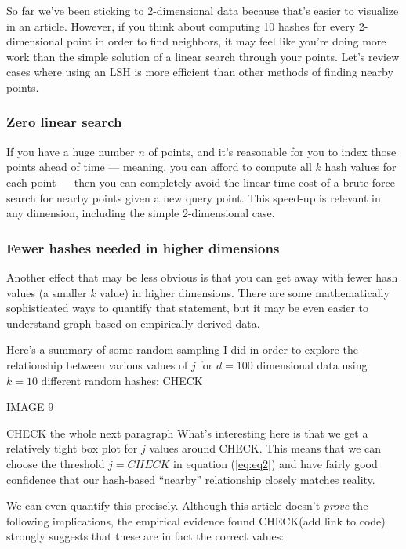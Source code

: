 \documentclass[20pt,]{extarticle}
\begin{document}
So far we've been sticking to 2-dimensional data because that's easier
to visualize in an article. However, if you think about computing 10
hashes for every 2-dimensional point in order to find neighbors, it may
feel like you're doing more work than the simple solution of a linear
search through your points. Let's review cases where using an LSH is
more efficient than other methods of finding nearby points.

\subsubsection{Zero linear search}\label{zero-linear-search}

If you have a huge number \(n\) of points, and it's reasonable for you
to index those points ahead of time --- meaning, you can afford to
compute all \(k\) hash values for each point --- then you can completely
avoid the linear-time cost of a brute force search for nearby points
given a new query point. This speed-up is relevant in any dimension,
including the simple 2-dimensional case.

\subsubsection{Fewer hashes needed in higher
dimensions}\label{fewer-hashes-needed-in-higher-dimensions}

Another effect that may be less obvious is that you can get away with
fewer hash values (a smaller \(k\) value) in higher dimensions. There
are some mathematically sophisticated ways to quantify that statement,
but it may be even easier to understand graph based on empirically
derived data.

Here's a summary of some random sampling I did in order to explore the
relationship between various values of \(j\) for \(d=100\) dimensional
data using \(k=10\) different random hashes: CHECK

IMAGE 9

CHECK the whole next paragraph What's interesting here is that we get a
relatively tight box plot for \(j\) values around CHECK. This means that
we can choose the threshold \(j=CHECK\) in equation (\ref{eq:eq2}) and
have fairly good confidence that our hash-based ``nearby'' relationship
closely matches reality.

We can even quantify this precisely. Although this article doesn't
\emph{prove} the following implications, the empirical evidence found
CHECK(add link to code) strongly suggests that these are in fact the
correct values:
\end{document}
